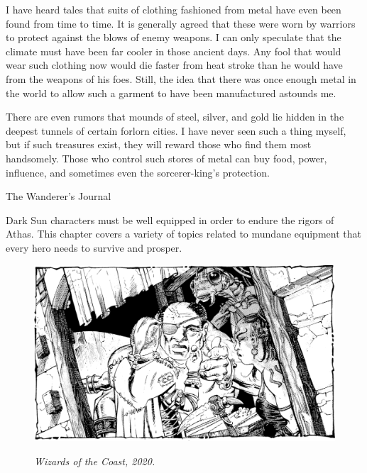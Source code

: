 {I have heard tales that suits of clothing fashioned from metal have even been found from time to time. It is generally agreed that these were worn by warriors to protect against the blows of enemy weapons. I can only speculate that the climate must have been far cooler in those ancient days. Any fool that would wear such clothing now would die faster from heat stroke than he would have from the weapons of his foes. Still, the idea that there was once enough metal in the world to allow such a garment to have been manufactured astounds me.

There are even rumors that mounds of steel, silver, and gold lie hidden in the deepest tunnels of certain forlorn cities. I have never seen such a thing myself, but if such treasures exist, they will reward those who find them most handsomely. Those who control such stores of metal can buy food, power, influence, and sometimes even the sorcerer-king's protection.}
{The Wanderer's Journal}

Dark Sun characters must be well equipped in order to endure the rigors of Athas. This chapter covers a variety of topics related to mundane equipment that every hero needs to survive and prosper.



\begin{figure}[b!]
\centering
\includegraphics[width=\textwidth]{images/bribe-2.png}
\par\textit{\small\textcopyright Wizards of the Coast, 2020.}
\end{figure}







